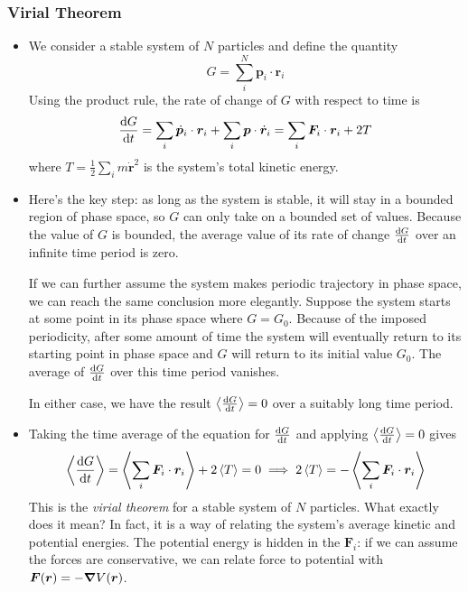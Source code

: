 \documentclass[11pt, a4paper]{article}
\newcommand{\bdot}[1]{\dot{\bm{#1}}} %
\begin{document}
\subsubsection{Virial Theorem}
\begin{itemize}
	\item We consider a stable system of $ N $ particles and define the quantity 
	\begin{equation*}
		G = \sum_{i}^{N} \bm{p}_{i} \cdot \bm{r}_{i}
	\end{equation*}
	Using the product rule, the rate of change of $ G $ with respect to time is
	\begin{equation*}
		\dv{G}{t} = \sum_{i} \bdot{p}_{i} \cdot \bm{r}_{i} + \sum_{i} \bm{p} \cdot \bdot{r}_{i} = \sum_{i} \bm{F}_{i} \cdot \bm{r}_{i} + 2 T
	\end{equation*}
	where $ T = \frac{1}{2} \sum_{i} m \bdot{r}^{2} $ is the system's total kinetic energy.
	
	\item Here's the key step: as long as the system is stable, it will stay in a bounded region of phase space, so $ G $ can only take on a bounded set of values. Because the value of $ G $ is bounded, the average value of its rate of change $ \dv{G}{t} $ over an infinite time period is zero.
	
	If we can further assume the system makes periodic trajectory in phase space, we can reach the same conclusion more elegantly. Suppose the system starts at some point in its phase space where $ G = G_{0} $. Because of the imposed periodicity, after some amount of time the system will eventually return to its starting point in phase space and $ G $ will return to its initial value $ G_{0} $. The average of $ \dv{G}{t} $ over this time period vanishes. 
	
	In either case, we have the result $ \expval{\dv{G}{t}} = 0 $ over a suitably long time period.
	
	\item Taking the time average of the equation for $ \dv{G}{t} $ and applying $ \expval{\dv{G}{t}} = 0 $ gives
	\begin{equation*}
		\expval{\dv{G}{t}} = \expval{\sum_{i} \bm{F}_{i} \cdot \bm{r}_{i}} + 2 \expval{T} = 0 \implies 2 \expval{T}  = -\expval{\sum_{i} \bm{F}_{i} \cdot \bm{r}_{i}}
	\end{equation*}
	This is the \textit{virial theorem} for a stable system of $ N $ particles. What exactly does it mean? In fact, it is a way of relating the system's average kinetic and potential energies. The potential energy is hidden in the $ \bm{F}_{i} $: if we can assume the forces are conservative, we can relate force to potential with $ \bm{F}(\bm{r}) = - \grad{V}(\bm{r}) $.
	

\end{itemize}
\end{document}
